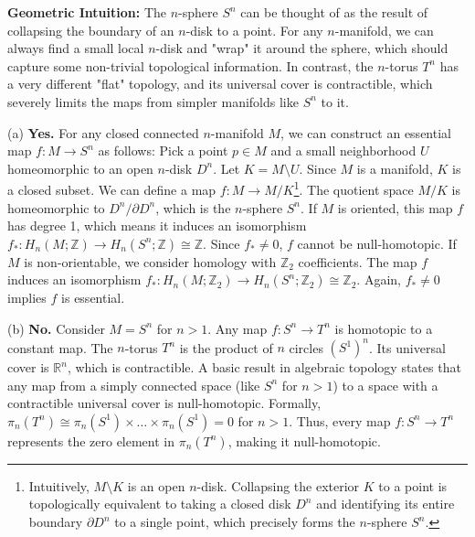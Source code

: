 \begin{solution}
\textbf{Geometric Intuition:} The $n$-sphere $S^n$ can be thought of as the result of collapsing the boundary of an $n$-disk to a point. For any $n$-manifold, we can always find a small local $n$-disk and "wrap" it around the sphere, which should capture some non-trivial topological information. In contrast, the $n$-torus $T^n$ has a very different "flat" topology, and its universal cover is contractible, which severely limits the maps from simpler manifolds like $S^n$ to it.

(a) \textbf{Yes.} For any closed connected $n$-manifold $M$, we can construct an essential map $f: M \to S^n$ as follows:
Pick a point $p \in M$ and a small neighborhood $U$ homeomorphic to an open $n$-disk $D^n$. Let $K = M \setminus U$. Since $M$ is a manifold, $K$ is a closed subset. We can define a map $f: M \to M/K$\footnote{Intuitively, $M \setminus K$ is an open $n$-disk. Collapsing the exterior $K$ to a point is topologically equivalent to taking a closed disk $D^n$ and identifying its entire boundary $\partial D^n$ to a single point, which precisely forms the $n$-sphere $S^n$.}. The quotient space $M/K$ is homeomorphic to $D^n / \partial D^n$, which is the $n$-sphere $S^n$.
If $M$ is oriented, this map $f$ has degree 1, which means it induces an isomorphism $f_*: H_n(M; \mathbb{Z}) \to H_n(S^n; \mathbb{Z}) \cong \mathbb{Z}$. Since $f_* \neq 0$, $f$ cannot be null-homotopic.
If $M$ is non-orientable, we consider homology with $\mathbb{Z}_2$ coefficients. The map $f$ induces an isomorphism $f_*: H_n(M; \mathbb{Z}_2) \to H_n(S^n; \mathbb{Z}_2) \cong \mathbb{Z}_2$. Again, $f_* \neq 0$ implies $f$ is essential.

(b) \textbf{No.} Consider $M = S^n$ for $n > 1$. Any map $f: S^n \to T^n$ is homotopic to a constant map.
The $n$-torus $T^n$ is the product of $n$ circles $(S^1)^n$. Its universal cover is $\mathbb{R}^n$, which is contractible. A basic result in algebraic topology states that any map from a simply connected space (like $S^n$ for $n > 1$) to a space with a contractible universal cover is null-homotopic. Formally, $\pi_n(T^n) \cong \pi_n(S^1) \times \dots \times \pi_n(S^1) = 0$ for $n > 1$. Thus, every map $f: S^n \to T^n$ represents the zero element in $\pi_n(T^n)$, making it null-homotopic.
\end{solution}

